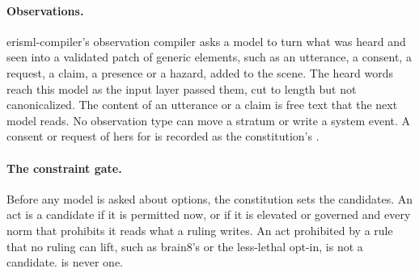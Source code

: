 \paragraph{Observations.} erisml-compiler's observation compiler asks a model to turn what was heard
and seen into a validated patch of generic elements, such as an utterance, a consent, a request, a
claim, a presence or a hazard, added to the scene. The heard words reach this model as the input
layer passed them, cut to length but not canonicalized. The content of an utterance or a claim is
free text that the next model reads. No observation type can move a stratum or write a system event. A
consent or request of hers for  is recorded as the constitution's
.

\paragraph{The constraint gate.} Before any model is asked about options, the constitution sets the
candidates. An act is a candidate if it is permitted now, or if it is elevated or governed and every
norm that prohibits it reads what a ruling writes. An act prohibited by a rule that no ruling can
lift, such as brain8's  or the less-lethal opt-in, is not a candidate.
 is never one.


